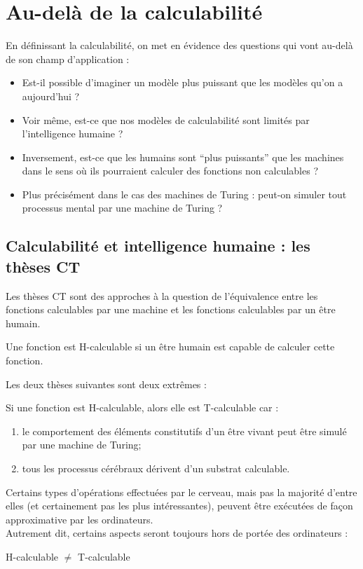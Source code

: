 \section{Au-delà de la calculabilité}
\label{sub:au_del_de_la_calculabilit_}
En définissant la calculabilité, on met en évidence des questions qui vont au-delà de son champ d'application :
\begin{itemize}
	\item Est-il possible d'imaginer un modèle plus puissant que les modèles qu'on a aujourd'hui ?
	\item Voir même, est-ce que nos modèles de calculabilité sont limités par l'intelligence humaine ?
	\item Inversement, est-ce que les humains sont ``plus puissants'' que les machines dans le sens où ils pourraient calculer des fonctions non calculables ?
	\item Plus précisément dans le cas des machines de Turing : peut-on simuler tout processus mental par une machine de Turing ?
\end{itemize}
 

\subsection{Calculabilité et intelligence humaine : les thèses CT}
Les thèses CT sont des approches à la question de l'équivalence entre les fonctions calculables par une machine et les fonctions calculables par un être humain.

\begin{mydef}[H-calculable]
Une fonction est H-calculable si un être humain est capable de calculer cette fonction.
\end{mydef}

Les deux thèses suivantes sont deux extrêmes :
\begin{mythese}
Si une fonction est H-calculable, alors elle est T-calculable car :
\begin{enumerate}
	\item le comportement des éléments constitutifs d'un être vivant peut être simulé par une machine de Turing;
	\item tous les processus cérébraux dérivent d'un substrat calculable.
\end{enumerate}
\end{mythese}

\begin{mythese}
Certains types d'opérations effectuées par le cerveau, mais pas la majorité d'entre elles (et certainement pas les plus intéressantes), peuvent être exécutées de façon approximative par les ordinateurs.\\
Autrement dit, certains aspects seront toujours hors de portée des ordinateurs :
\begin{center}
H-calculable $\neq$ T-calculable
\end{center}
\end{mythese}

